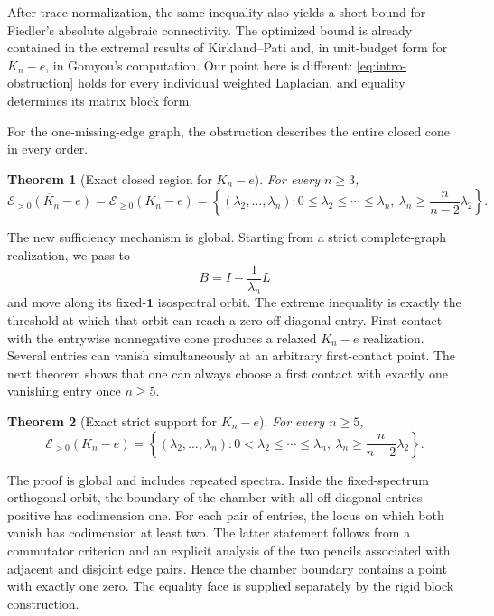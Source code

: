 \documentclass[11pt,reqno]{amsart}
\newtheorem{theorem}{Theorem}[section]
\theoremstyle{definition}
\theoremstyle{remark}
\newcommand{\one}{\mathbf 1}
\begin{document}
After trace normalization, the same inequality also yields a short bound for
Fiedler's absolute algebraic connectivity.  The optimized bound is already
contained in the extremal results of Kirkland--Pati and, in unit-budget form
for $K_n-e$, in Gomyou's computation.  Our point here is different:
\eqref{eq:intro-obstruction} holds for every individual weighted Laplacian,
and equality determines its matrix block form.

For the one-missing-edge graph, the obstruction describes the entire closed
cone in every order.

\begin{theorem}[Exact closed region for $K_n-e$]
\label{thm:exact-kne-cone}
For every $n\ge3$,
\begin{equation}\label{eq:exact-kne-cone}
  \overline{\mathcal E_{>0}(K_n-e)}
  =\mathcal E_{\ge0}(K_n-e)
  =\left\{(\lambda_2,\ldots,\lambda_n):
  0\le\lambda_2\le\cdots\le\lambda_n,
  \ \lambda_n\ge\frac{n}{n-2}\lambda_2\right\}.
\end{equation}
\end{theorem}

The new sufficiency mechanism is global.  Starting from a strict
complete-graph realization, we pass to
\[
  B=I-\frac1{\lambda_n}L
\]
and move along its fixed-$\one$ isospectral orbit.  The extreme inequality is
exactly the threshold at which that orbit can reach a zero off-diagonal
entry.  First contact with the entrywise nonnegative cone produces a relaxed
$K_n-e$ realization.  Several entries can vanish simultaneously at an
arbitrary first-contact point.  The next theorem shows that one can always
choose a first contact with exactly one vanishing entry once $n\ge5$.

\begin{theorem}[Exact strict support for $K_n-e$]
\label{thm:strict-kne-intro}
For every $n\ge5$,
\[
 \mathcal E_{>0}(K_n-e)
 =\left\{(\lambda_2,\ldots,\lambda_n):
 0<\lambda_2\le\cdots\le\lambda_n,
 \ \lambda_n\ge\frac{n}{n-2}\lambda_2\right\}.
\]
\end{theorem}

The proof is global and includes repeated spectra.  Inside the fixed-spectrum
orthogonal orbit, the boundary of the chamber with all off-diagonal entries
positive has codimension one.  For each pair of entries, the locus on which
both vanish has codimension at least two.  The latter statement follows from
a commutator criterion and an explicit analysis of the two pencils associated
with adjacent and disjoint edge pairs.  Hence the chamber boundary contains a
point with exactly one zero.  The equality face is supplied separately by
the rigid block construction.
\end{document}
